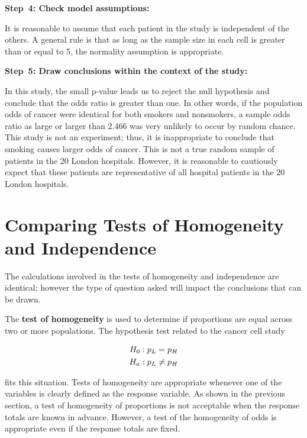 \documentclass[
]{report}
\begin{document}
\textbf{Step~4: Check model assumptions:}

It is reasonable to assume that each patient in the study is independent of the others. A general rule is that as long as the sample size in each cell is greater than or equal to 5, the normality assumption is appropriate.

\textbf{Step~5: Draw conclusions within the context of the study:}

In this study, the small p-value leads us to reject the null hypothesis and conclude that the odds ratio is greater than one. In other words, if the population odds of cancer were identical for both smokers and nonsmokers, a sample odds ratio as large or larger than 2.466 was very unlikely to occur by random chance. This study is not an experiment; thus, it is inappropriate to conclude that smoking causes larger odds of cancer. This is not a true random sample of patients in the 20 London hospitals. However, it is reasonable to cautiously expect that these patients are representative of all hospital patients in the 20 London hospitals.

\hypertarget{comparing-tests-of-homogeneity-and-independence}{%
\section{\texorpdfstring{\textbf{Comparing Tests of Homogeneity and Independence}}{Comparing Tests of Homogeneity and Independence}}\label{comparing-tests-of-homogeneity-and-independence}}

The calculations involved in the tests of homogeneity and independence are identical; however the type of question asked will impact the conclusions that can be drawn.

The \textbf{test of homogeneity} is used to determine if proportions are equal across two or more populations. The hypothesis test related to the cancer cell study

\begin{align}
H_0: p_L &= p_H \notag \\ 
H_a: p_L &\neq p_H \notag
\end{align}

fits this situation. Tests of homogeneity are appropriate whenever one of the variables is clearly defined as the response variable. As shown in the previous section, a test of homogeneity of proportions is not acceptable when the response totals are known in advance. However, a test of the homogeneity of odds is appropriate even if the response totals are fixed.
\end{document}
